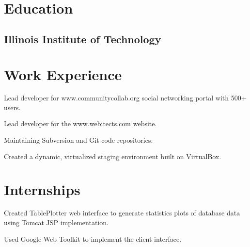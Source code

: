 \documentclass{resume}
\begin{document}
\author{Dmitry Ratnikov}
\maketitle

\section{Education}

\subsection{Illinois Institute of Technology}


\section{Work Experience}

\begin{compactitem}
  \item Lead developer for www.communitycollab.org social networking portal with 500+ users.
  \item Lead developer for the www.webitects.com website.
  \item Maintaining Subversion and Git code repositories.
  \item Created a dynamic, virtualized staging environment built on VirtualBox.
\end{compactitem}

\section{Internships}

\begin{compactitem}
  \item Created TablePlotter web interface to generate statistics plots of database data using Tomcat JSP implementation.
  \item Used Google Web Toolkit to implement the client interface.
\end{compactitem}
\end{document}
